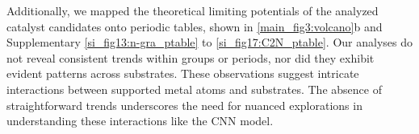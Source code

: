 Additionally, we mapped the theoretical limiting potentials of the analyzed catalyst candidates onto periodic tables, shown in \cref{main_fig3:volcano}b and Supplementary \cref{si_fig13:n-gra_ptable} to \cref{si_fig17:C2N_ptable}.
Our analyses do not reveal consistent trends within groups or periods, nor did they exhibit evident patterns across substrates.
These observations suggest intricate interactions between supported metal atoms and substrates.
The absence of straightforward trends underscores the need for nuanced explorations in understanding these interactions like the CNN model.
